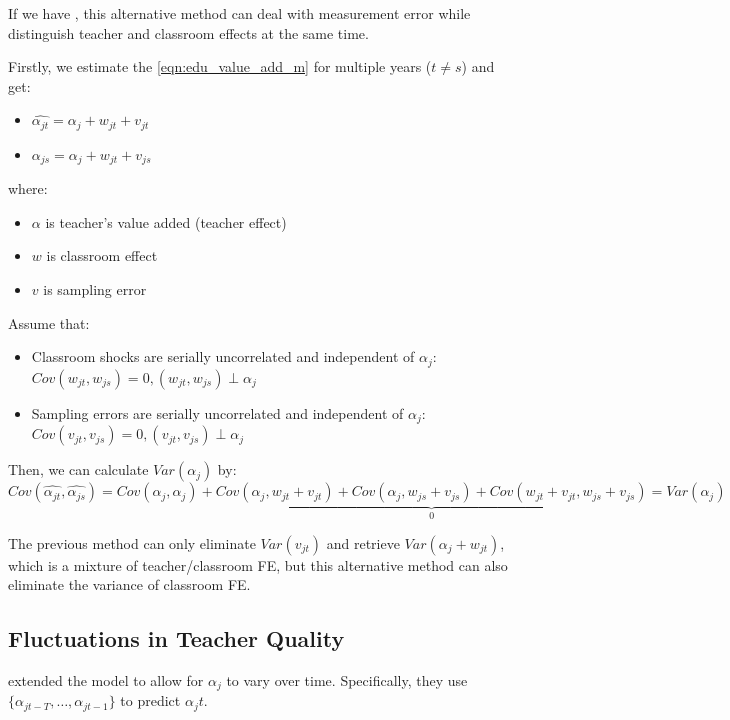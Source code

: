         If we have , this alternative method can deal with measurement error while distinguish teacher and classroom effects at the same time.

        Firstly, we estimate the \ref{eqn:edu_value_add_m} for multiple years ($t \neq s$) and get:
        \begin{itemize}
            \item $\widehat{\alpha_{jt}}=\alpha_j + w_{jt} + v_{jt}$
            \item $\widehat{\alpha_{js}}=\alpha_j + w_{jt} + v_{js}$
        \end{itemize}
        where:
        \begin{itemize}
            \item $\alpha$ is teacher's value added (teacher effect)
            \item $w$ is classroom effect
            \item $v$ is sampling error
        \end{itemize}
        Assume that:
        \begin{itemize}
            \item Classroom shocks are serially uncorrelated and independent of $\alpha_j$: $Cov(w_{jt},w_{js})=0, (w_{jt},w_{js})\perp \alpha_j$
            \item Sampling errors are serially uncorrelated and independent of $\alpha_j$: $Cov(v_{jt},v_{js})=0, (v_{jt},v_{js})\perp \alpha_j$
        \end{itemize}
        Then, we can calculate $Var(\alpha_j)$ by:
        $$Cov(\widehat{\alpha_{jt}},\widehat{\alpha_{js}}) = Cov(\alpha_j,\alpha_j) + \underbrace{Cov(\alpha_j,w_{jt}+v_{jt}) + Cov(\alpha_j,w_{js}+v_{js}) +Cov(w_{jt}+v_{jt},w_{js}+v_{js})}_{0} = Var(\alpha_j)$$

        The previous method can only eliminate $Var(v_{jt})$ and retrieve $Var(\alpha_j + w_{jt})$, which is a mixture of teacher/classroom FE, but this alternative method can also eliminate the variance of classroom FE.
        
    \subsection{Fluctuations in Teacher Quality}

        \cite{chetty_measuring_2014} extended the model to allow for $\alpha_j$ to vary over time. Specifically, they use $\{ \alpha_{jt-T},\dots,\alpha_{jt-1} \}$ to predict $\alpha_jt$.

